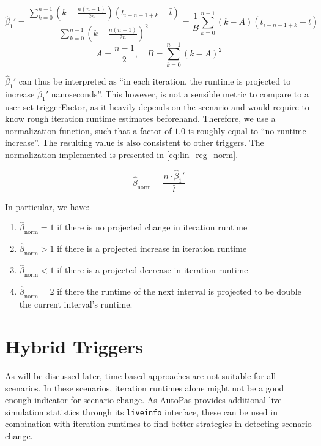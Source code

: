 \begin{equation}
\hat{\beta}_1' =\frac{\sum_{k=0}^{n-1}\left(k-\frac{n(n-1)}{2n}\right)(t_{i-n-1+k}-\bar t)}{\sum_{k=0}^{n-1}\left(k-\frac{n(n-1)}{2n}\right)^2}= \frac{1}{B}\sum_{k=0}^{n-1}\left(k-A\right)(t_{i-n-1+k}-\bar t)\label{eq:lin_reg_simpl}
\end{equation}
\begin{equation}
	A = \frac{n-1}{2}, \quad B=\sum_{k=0}^{n-1}\left(k-A\right)^2\label{eq:lin_reg_consts}
\end{equation}

$\hat\beta_1'$ can thus be interpreted as \enquote{in each iteration, the runtime is projected to increase $\hat\beta_1'$ nanoseconds}. This however, is not a sensible metric to compare to a user-set triggerFactor, as it heavily depends on the scenario and would require to know rough iteration runtime estimates beforehand. Therefore, we use a normalization function, such that a factor of $1.0$ is roughly equal to \enquote{no runtime increase}. The resulting value is also consistent to other triggers. The normalization implemented is presented in \eqref{eq:lin_reg_norm}.


\begin{equation}
	\hat\beta_{\text{norm}} = \frac{n\cdot\hat\beta_1'}{\bar t}\label{eq:lin_reg_norm}
\end{equation}

In particular, we have:

\begin{enumerate}[label=(\roman*)]
	\item $\hat\beta_{\text{norm}} = 1$ if there is no projected change in iteration runtime
	\item $\hat\beta_{\text{norm}} > 1$ if there is a projected increase in iteration runtime
	\item $\hat\beta_{\text{norm}} < 1$ if there is a projected decrease in iteration runtime
	\item $\hat\beta_{\text{norm}} = 2$ if there the runtime of the next interval is projected to be double the current interval's runtime.
\end{enumerate}

\section{Hybrid Triggers}
As will be discussed later, time-based approaches are not suitable for all scenarios. In these scenarios, iteration runtimes alone might not be a good enough indicator for scenario change. As AutoPas provides additional live simulation statistics through its \texttt{liveinfo} interface, these can be used in combination with iteration runtimes to find better strategies in detecting scenario change.

